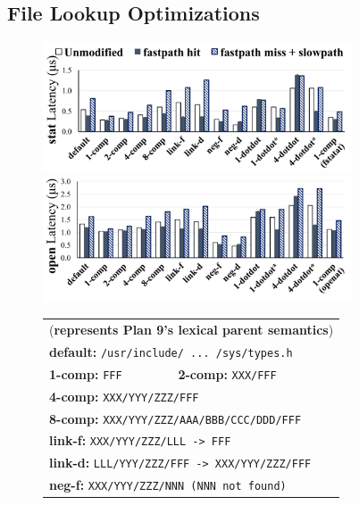 
\subsection{File Lookup Optimizations}

\begin{figure}
\scriptsize
\centering
\begin{minipage}{3.8in}
\centering
\includegraphics[width=3.6in]{dcache/plots/lm_stat.pdf} \\
\includegraphics[width=3.6in]{dcache/plots/lm_open.pdf} \\
\end{minipage}
\begin{minipage}{2.6in}
\begin{tabular}{ll}
\multicolumn{2}{l}{({\bf * represents Plan 9's lexical parent semantics})} \\
\multicolumn{2}{l}{{\bf default:} \tt /usr/include/ ... /sys/types.h} \\
{{\bf 1-comp:} \tt FFF} &
{{\bf 2-comp:} \tt XXX/FFF} \\
\multicolumn{2}{l}{{\bf 4-comp:} \tt XXX/YYY/ZZZ/FFF} \\
\multicolumn{2}{l}{{\bf 8-comp:} \tt XXX/YYY/ZZZ/AAA/BBB/CCC/DDD/FFF} \\
\multicolumn{2}{l}{{\bf link-f:} \tt XXX/YYY/ZZZ/LLL -> FFF} \\
\multicolumn{2}{l}{{\bf link-d:} \tt LLL/YYY/ZZZ/FFF -> XXX/YYY/ZZZ/FFF} \\
\multicolumn{2}{l}{{\bf neg-f:} \tt XXX/YYY/ZZZ/NNN (NNN not found)} \\

\end{tabular}
\end{minipage}
\end{figure}
